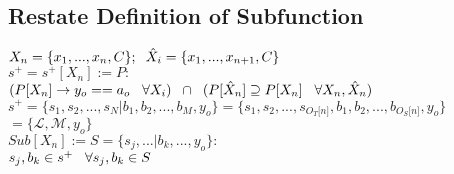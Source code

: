 \documentclass[11pt]{article}
\begin{document}
\subsection{Restate Definition of Subfunction}
\begin{center}
\vspace{2mm}
$
X_n = \{x_1,...,x_n,C\}; \hspace{2mm} \hat{X}_i = \{x_1,...,x_{n+1},C\}
$
\\ \vspace{4mm}
$
s^+ = s^+[X_n] := P :
$
\\ \vspace{2mm}
$
(P \lbrack X_n \rbrack \rightarrow y_{o} == a_{o} \hspace{3mm} \forall X_i) \hspace{2mm} \cap \hspace{2mm} (P[\hat{X}_n] \supseteq P[X_n] \hspace{3mm} \forall X_n,\hat{X}_n)
$
\\ \vspace{6mm}
$
s^+ = \{ s_1,s_2,...,s_N|b_1,b_2,...,b_M,y_o\} = \{ s_1,s_2,...,s_{O_T \lbrack n \rbrack }, b_1, b_2,...,b_{O_S \lbrack n \rbrack},y_o \}
$
\\ \vspace{2mm}
$
= \{ \mathcal{L},\mathcal{M},y_o\}
$
\\ \vspace{6mm}
$
Sub[X_n] := S = \{s_j,...|b_k,...,y_o\}:
$
\\ \vspace{2mm}
$
s_j,b_k \in s^+ \hspace{3mm} \forall s_j,b_k \in S
$
\end{center}
\end{document}
